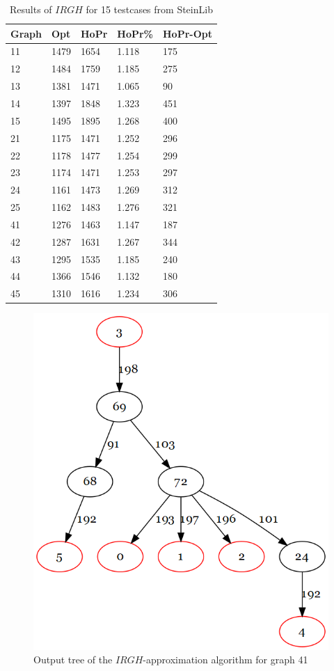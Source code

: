 \begin{table}[htbp]
 \caption{Results of $IRGH$ for 15 testcases from SteinLib \cite{Dui93}}\label{tab:HoPrResults} 	
 \centering
 \begin{tabular}{l l l l l}
\toprule
Graph & Opt & HoPr & HoPr\% & HoPr-Opt \\
\midrule
11	& 1479	& 1654	& 1.118	& 175 \\
12	& 1484	& 1759	& 1.185	& 275 \\
13	& 1381	& 1471	& 1.065	& 90 	\\
14	& 1397	& 1848	& 1.323	& 451 \\
15	& 1495	& 1895	& 1.268	& 400 \\
\midrule 
21	& 1175	& 1471	& 1.252	& 296 \\
22	& 1178	& 1477	& 1.254	& 299 \\
23	& 1174	& 1471	& 1.253	& 297 \\
24	& 1161	& 1473	& 1.269 	& 312 \\
25	& 1162	& 1483	& 1.276	& 321 \\
\midrule
41	& 1276	& 1463	& 1.147	& 187 \\
42	& 1287	& 1631	& 1.267	& 344 \\
43	& 1295	& 1535	& 1.185	& 240 \\
44	& 1366	& 1546	& 1.132	& 180 \\
45	& 1310	& 1616	& 1.234	& 306 \\
\bottomrule
\end{tabular}
\end{table}

\begin{figure}[htbp]
\centering
\includegraphics[scale=0.40]{figures/HougardyProemel.png}
\caption{Output tree of the $IRGH$-approximation algorithm for graph 41}\label{fig:HoPrTree41}
\end{figure}
